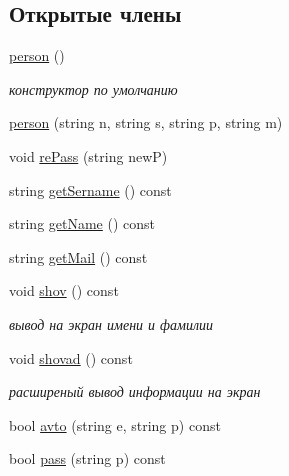 \subsection*{Открытые члены}
\begin{DoxyCompactItemize}
\item 
\hyperlink{classperson_ac8851f8c7ff0e99377cf479a07333e7a}{person} ()
\begin{DoxyCompactList}\small\item\em конструктор по умолчанию \end{DoxyCompactList}\item 
\hyperlink{classperson_a3d8876846c9b757521ae56bf6a7c841a}{person} (string n, string s, string p, string m)
\item 
void \hyperlink{classperson_ab6d360263a908819b73ea80ab6fdd1c8}{re\-Pass} (string new\-P)
\item 
string \hyperlink{classperson_a76805014c07a59970b8244c79c3c6054}{get\-Sername} () const 
\item 
string \hyperlink{classperson_a8c8175284e9e52ddbf4fa3c9a04cf536}{get\-Name} () const 
\item 
string \hyperlink{classperson_a7152242a9cf64e4cc2d71ee32dbc4f4c}{get\-Mail} () const 
\item 
void \hyperlink{classperson_aa3c73bfc0527bed2c822c05d824679b0}{shov} () const 
\begin{DoxyCompactList}\small\item\em вывод на экран имени и фамилии \end{DoxyCompactList}\item 
void \hyperlink{classperson_ad27bfbd8e8c65c241abecbea2c6a0bc2}{shovad} () const 
\begin{DoxyCompactList}\small\item\em расширеный вывод информации на экран \end{DoxyCompactList}\item 
bool \hyperlink{classperson_a2ee9999b24bc3dfbc7da5003c4014d0a}{avto} (string e, string p) const 
\item 
bool \hyperlink{classperson_a120e871984ef5e815edf939331af379d}{pass} (string p) const 
\end{DoxyCompactItemize}
